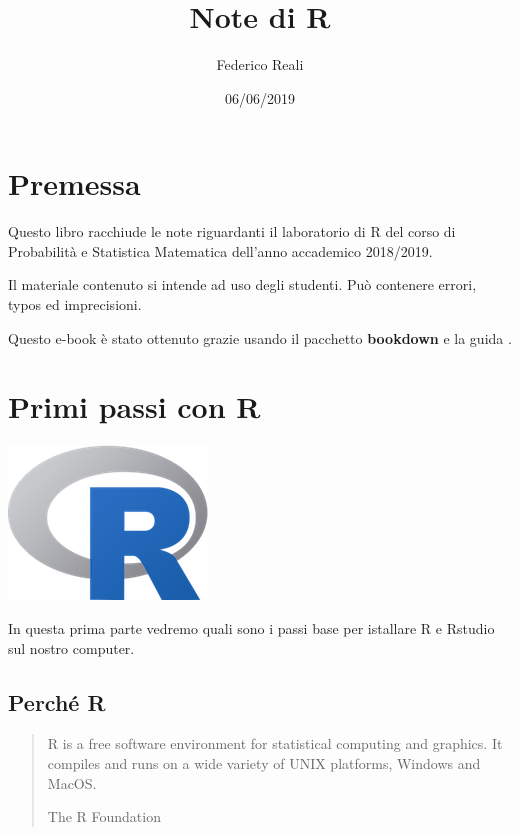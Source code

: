\documentclass[]{book}
\title{Note di R}
\author{Federico Reali}
\date{06/06/2019}
\begin{document}
\maketitle

{
\setcounter{tocdepth}{1}
\tableofcontents
}
\hypertarget{premessa}{%
\chapter*{Premessa}\label{premessa}}

Questo libro racchiude le note riguardanti il laboratorio di R del corso di Probabilità e Statistica Matematica dell'anno accademico 2018/2019.

Il materiale contenuto si intende ad uso degli studenti. Può contenere errori, typos ed imprecisioni.

Questo e-book è stato ottenuto grazie usando il pacchetto \textbf{bookdown} \citep{R-bookdown} e la guida \citep{xie2015}.

\hypertarget{primi-passi-con-r}{%
\chapter{Primi passi con R}\label{primi-passi-con-r}}

\includegraphics{./media/Rlogo.png}

In questa prima parte vedremo quali sono i passi base per istallare R e Rstudio sul nostro computer.

\hypertarget{perche-r}{%
\section{Perché R}\label{perche-r}}

\begin{quote}
R is a free software environment for statistical computing and graphics.
It compiles and runs on a wide variety of UNIX platforms, Windows and MacOS.

 The R Foundation
\end{quote}
\end{document}
